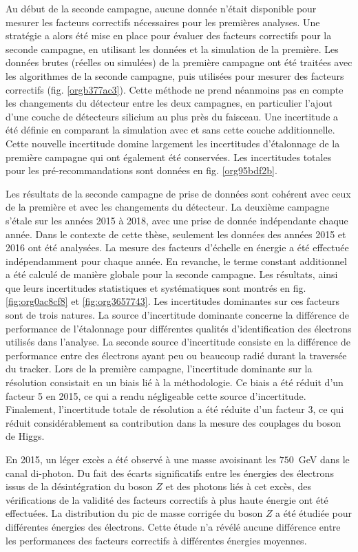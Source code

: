 Au début de la seconde campagne, aucune donnée n'était disponible pour mesurer les facteurs correctifs nécessaires pour les premières analyses.
Une stratégie a alors été mise en place pour évaluer des facteurs correctifs pour la seconde campagne, en utilisant les données et la simulation de la première.
Les données brutes (réelles ou simulées) de la première campagne ont été traitées avec les algorithmes de la seconde campagne, puis utilisées pour mesurer des facteurs correctifs (fig. \ref{orgb377ac3}).
Cette méthode ne prend néanmoins pas en compte les changements du détecteur entre les deux campagnes, en particulier l'ajout d'une couche de détecteurs silicium au plus près du faisceau.
Une incertitude a été définie en comparant la simulation avec et sans cette couche additionnelle.
Cette nouvelle incertitude  domine largement les incertitudes d'étalonnage de la première campagne qui ont également été conservées.
Les incertitudes totales pour les pré-recommandations sont données en fig. \ref{org95bdf2b}.


Les résultats de la seconde campagne de prise de données sont cohérent avec ceux de la première et avec les changements du détecteur.
La deuxième campagne s'étale sur les années 2015 à 2018, avec une prise de donnée indépendante chaque année.
Dans le contexte de cette thèse, seulement les données des années 2015 et 2016 ont été analysées.
La mesure des facteurs d'échelle en énergie a été effectuée indépendamment pour chaque année.
En revanche, le terme constant additionnel a été calculé de manière globale pour la seconde campagne.
Les résultats, ainsi que leurs incertitudes statistiques et systématiques sont montrés en fig. \ref{fig:org0ac8cf8} et \ref{fig:org3657743}.
Les incertitudes dominantes sur ces facteurs sont de trois natures.
La source d'incertitude dominante concerne la différence de performance de l'étalonnage pour différentes qualités d'identification des électrons utilisés dans l'analyse.
La seconde source d'incertitude consiste en la différence de performance entre des électrons ayant peu ou beaucoup radié durant la traversée du tracker.
Lors de la première campagne, l'incertitude dominante sur la résolution consistait en un biais lié à la méthodologie.
Ce biais a été réduit d'un facteur 5 en 2015, ce qui a rendu négligeable cette source d'incertitude.
Finalement, l'incertitude totale de résolution a été réduite d'un facteur 3, ce qui réduit considérablement sa contribution dans la mesure des couplages du boson de Higgs.

En 2015, un léger excès a été observé à une masse avoisinant les $750$~GeV dans le canal di-photon.
Du fait des écarts significatifs entre les énergies des électrons issus de la désintégration du boson $Z$ et des photons liés à cet excès, des vérifications de la validité des facteurs correctifs à plus haute énergie ont été effectuées.
La distribution du pic de masse corrigée du boson $Z$ a été étudiée pour différentes énergies des électrons.
Cette étude n'a révélé aucune différence entre les performances des facteurs correctifs à différentes énergies moyennes.


